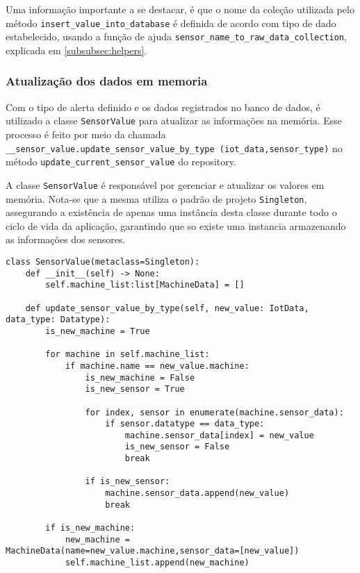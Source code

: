 Uma informação importante a se destacar, é que o nome da coleção utilizada pelo método \texttt{insert\_value\_into\_database} é definida de acordo com tipo de dado estabelecido, usando a função de ajuda \texttt{sensor\_name\_to\_raw\_data\_collection}, explicada em \ref{subsubsec:helpers}.

\subsubsection{Atualização dos dados em memoria}

Com o tipo de alerta definido e os dados registrados no banco de dados, é utilizado a classe \texttt{SensorValue} para atualizar as informações na memória. Esse processo é feito por meio da chamada \texttt{\_\_sensor\_value.update\_sensor\_value\_by\_type (iot\_data,sensor\_type)} no método \texttt{update\_current\_sensor\_value} do repository.


A classe \texttt{SensorValue} é responsável por gerenciar e atualizar os valores em memória. Nota-se que a mesma utiliza o padrão de projeto \texttt{Singleton}, assegurando a existência de apenas uma instância desta classe durante todo o ciclo de vida da aplicação, garantindo que so existe uma instancia armazenando as informações dos sensores.

\begin{verbatim}
class SensorValue(metaclass=Singleton):
    def __init__(self) -> None:
        self.machine_list:list[MachineData] = []

    def update_sensor_value_by_type(self, new_value: IotData, data_type: Datatype):
        is_new_machine = True

        for machine in self.machine_list:
            if machine.name == new_value.machine:
                is_new_machine = False
                is_new_sensor = True

                for index, sensor in enumerate(machine.sensor_data):
                    if sensor.datatype == data_type:
                        machine.sensor_data[index] = new_value
                        is_new_sensor = False
                        break

                if is_new_sensor:
                    machine.sensor_data.append(new_value)
                    break

        if is_new_machine:
            new_machine = MachineData(name=new_value.machine,sensor_data=[new_value])
            self.machine_list.append(new_machine)
\end{verbatim}

